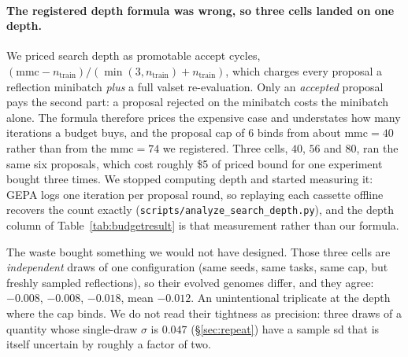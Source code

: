 \documentclass[11pt]{article}
\begin{document}
\paragraph{The registered depth formula was wrong, so three cells landed on one depth.} We priced
search depth as promotable accept cycles, $(\mathrm{mmc} - n_{\mathrm{train}})/(\min(3,
n_{\mathrm{train}}) + n_{\mathrm{train}})$, which charges every proposal a reflection minibatch
\emph{plus} a full valset re-evaluation. Only an \emph{accepted} proposal pays the second part: a
proposal rejected on the minibatch costs the minibatch alone. The formula therefore prices the
expensive case and understates how many iterations a budget buys, and the proposal cap of $6$
binds from about $\mathrm{mmc}=40$ rather than from the $\mathrm{mmc}=74$ we registered. Three
cells, $40$, $56$ and $80$, ran the same six proposals, which cost roughly
\$5 of priced bound for one experiment bought three times. We stopped computing depth and started
measuring it: GEPA logs one iteration per proposal round, so replaying each cassette offline
recovers the count exactly (\texttt{scripts/analyze\_search\_depth.py}), and the depth column of
Table~\ref{tab:budgetresult} is that measurement rather than our formula.

The waste bought something we would not have designed. Those three cells are \emph{independent}
draws of one configuration (same seeds, same tasks, same cap, but freshly sampled reflections),
so their evolved genomes differ, and they agree: $-0.008$, $-0.008$, $-0.018$, mean $-0.012$.
An unintentional triplicate at the depth where the cap binds. We do not read their tightness as
precision: three draws of a quantity whose single-draw $\sigma$ is $0.047$ (\S\ref{sec:repeat})
have a sample sd that is itself uncertain by roughly a factor of two.
\end{document}
